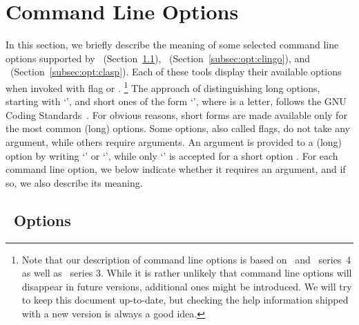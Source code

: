 \section{Command Line Options}\label{sec:options}

In this section, we briefly describe the meaning of
some selected command line options supported by
\gringo\ (Section~\ref{subsec:opt:gringo}),
\clingo\ (Section~\ref{subsec:opt:clingo}), and
\clasp\ (Section~\ref{subsec:opt:clasp}).
Each of these tools display their available options
when invoked with flag  or .%
\footnote{%
  Note that our description of command line options
  is based on \gringo\ and \clingo\ series~4
  as well as \clasp\ series 3.
  While it is rather unlikely that command line options will
  disappear in future versions,
  additional ones might be introduced.
  We will try to keep this document up-to-date,
  but checking the help information shipped
  with a new version is always a good idea.}
The approach of distinguishing long options, starting with `\code{--}',
and short ones of the form `',
where  is a letter,
follows the GNU Coding Standards~\cite{GNUcoding}.
For obvious reasons,
short forms are made available only for the most common (long) options.
Some options, also called flags, do not take any argument,
while others require arguments.
An argument  is provided to a (long) option 
by writing
`' or
`',
while only
`'
is accepted for a short option .
For each command line option,
we below indicate whether it requires an argument,
and if so, we also describe its meaning.


\subsection{\gringo\ Options}\label{subsec:opt:gringo}


